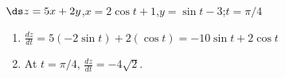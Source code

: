 {$\ds z=5x+2y$,\quad $x=2\cos t+1$,\quad $y=\sin t-3$;\quad $t=\pi/4$
}
{\begin{enumerate}
	\item $\frac{dz}{dt} = 5(-2\sin t)+2(\cos t) = -10\sin t+2\cos t$
	
	\item		At $t=\pi/4$, $\frac{dz}{dt} = -4\sqrt{2}$.
\end{enumerate}
}
